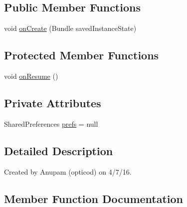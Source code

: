 \subsection*{Public Member Functions}
\begin{DoxyCompactItemize}
\item 
void \hyperlink{classorg_1_1buildmlearn_1_1dictation_1_1activities_1_1SplashActivity_a3f8ae779c27ff9899267cacfda7eb058}{on\+Create} (Bundle saved\+Instance\+State)
\end{DoxyCompactItemize}
\subsection*{Protected Member Functions}
\begin{DoxyCompactItemize}
\item 
void \hyperlink{classorg_1_1buildmlearn_1_1dictation_1_1activities_1_1SplashActivity_a553326955d2b719733eb334c144bf4bc}{on\+Resume} ()
\end{DoxyCompactItemize}
\subsection*{Private Attributes}
\begin{DoxyCompactItemize}
\item 
Shared\+Preferences \hyperlink{classorg_1_1buildmlearn_1_1dictation_1_1activities_1_1SplashActivity_a805ca184d2d560a8c6c04cec63570ed3}{prefs} = null
\end{DoxyCompactItemize}


\subsection{Detailed Description}
Created by Anupam (opticod) on 4/7/16. 

\subsection{Member Function Documentation}
